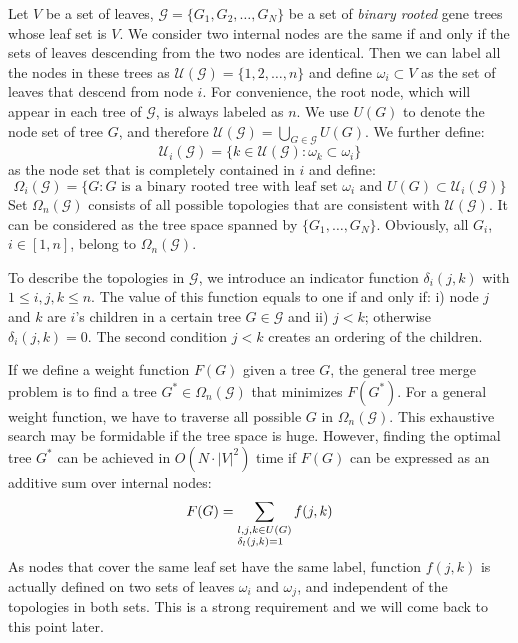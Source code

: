 \documentclass[pdftex,10pt]{article}
\begin{document}
Let $V$ be a set of leaves, $\mathcal{G}=\{G_1,G_2,\ldots,G_N\}$ be a
set of {\it binary rooted} gene trees whose leaf set is $V$. We consider
two internal nodes are the same if and only if the sets of leaves
descending from the two nodes are identical. Then we can label all the
nodes in these trees as $\mathcal{U}(\mathcal{G})=\{1,2,\ldots,n\}$ and
define $\omega_i\subset V$ as the set of leaves that descend from node
$i$. For convenience, the root node, which will appear in each tree of
$\mathcal{G}$, is always labeled as $n$. We use $U(G)$ to denote the
node set of tree $G$, and therefore
$\mathcal{U}(\mathcal{G})=\bigcup_{G\in\mathcal{G}} U(G)$. We further
define:
\begin{equation*}
  \mathcal{U}_i(\mathcal{G})=\{k\in\mathcal{U}(\mathcal{G}):\omega_k\subset\omega_i\}
\end{equation*}
as the node set that is completely contained in $i$ and define:
\begin{equation*}
  \Omega_i(\mathcal{G})=\{G:\mbox{$G$ is a binary rooted tree with leaf set $\omega_i$ and $U(G)\subset\mathcal{U}_i(\mathcal{G})$}\}
\end{equation*}
Set $\Omega_n(\mathcal{G})$ consists of all possible topologies that are
consistent with $\mathcal{U}(\mathcal{G})$. It can be considered as the
tree space spanned by $\{G_1,\ldots,G_N\}$.  Obviously, all $G_i$,
$i\in[1,n]$, belong to $\Omega_n(\mathcal{G})$.

To describe the topologies in $\mathcal{G}$, we introduce an indicator
function $\delta_i(j,k)$ with $1\leq i,j,k\leq n$. The value of this
function equals to one if and only if: i) node $j$ and $k$ are $i$'s
children in a certain tree $G\in\mathcal{G}$ and ii) $j<k$; otherwise
$\delta_i(j,k)=0$. The second condition $j<k$ creates an ordering of the
children.

If we define a weight function $F(G)$ given a tree $G$, the general tree
merge problem is to find a tree $G^*\in\Omega_n(\mathcal{G})$ that
minimizes $F(G^*)$. For a general weight function, we have to traverse
all possible $G$ in $\Omega_n(\mathcal{G})$. This exhaustive search may
be formidable if the tree space is huge. However, finding the optimal
tree $G^*$ can be achieved in $O(N\cdot|V|^2)$ time if $F(G)$ can be
expressed as an additive sum over internal nodes:
\begin{equation}\label{equ:F}
  F(G)=\sum_{\begin{subarray}{1}l,j,k\in U(G)\\\delta_l(j,k)=1\end{subarray}}f(j,k)
\end{equation}
As nodes that cover the same leaf set have the same label, function
$f(j,k)$ is actually defined on two sets of leaves $\omega_i$ and
$\omega_j$, and independent of the topologies in both sets. This
is a strong requirement and we will come back to this point later.
\end{document}

